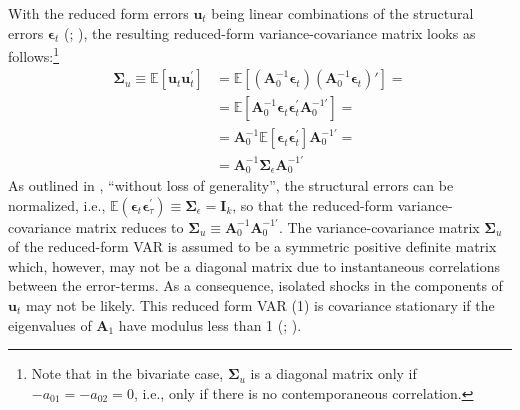 \documentclass[a4paper,11pt,listof=nochaptergap,oneside,pointednumbers,bibtotoc,bigheadings,liststotoc,hidelinks]{scrbook}
\theoremstyle{mysatz}
\theoremstyle{mydefinition}
\theoremstyle{mytheorem}
\theoremstyle{mybemerkung}
\newcommand{\vect}[1]{\boldsymbol{\mathbf{#1}}}
\begin{document}
With the reduced form errors $\vect{u}_t$ being linear combinations of the structural errors $\vect{\epsilon}_t$ (\citealp{lutkepohlkilian:17}; \citealp{zivot:00}), the resulting reduced-form variance-covariance matrix looks as follows:\footnote{Note that in the bivariate case, $\vect{\Sigma}_u$ is a diagonal matrix only if $-a_{01} = -a_{02} = 0$, i.e., only if there is no contemporaneous correlation.}
\begin{equation} \label{eq:svar6}
\begin{split}
 		\vect{\Sigma}_u \equiv \mathbb{E}[\vect{u}_t\vect{u}_t^'] & = \mathbb{E}[(\vect{A}_0^{-1}\vect{\epsilon}_t) (\vect{A}_0^{-1}\vect{\epsilon}_t)' ] = \\
		& = \mathbb{E}[\vect{A}_0^{-1}\vect{\epsilon}_t \vect{\epsilon}_t^'\vect{A}_0^{-1'}] = \\
		& = \vect{A}_0^{-1}\mathbb{E}[\vect{\epsilon}_t \vect{\epsilon}_t^']\vect{A}_0^{-1'} = \\
		& = \vect{A}_0^{-1}\vect{\Sigma}_\epsilon\vect{A}_0^{-1'}
\end{split}								
\end{equation}
As outlined in \citet[p. 109]{lutkepohlkilian:17}, ``without loss of generality'', the structural errors can be normalized, i.e., $\mathbb{E}(\vect{\epsilon}_t\vect{\epsilon}_{\tau}^') \equiv \vect{\Sigma}_\epsilon = \vect{\mathbf{I}}_k$, so that the reduced-form variance-covariance matrix reduces to $\vect{\Sigma}_u \equiv \vect{A}_0^{-1}\vect{A}_0^{-1'}$. The variance-covariance matrix $\vect{\Sigma}_u$ of the reduced-form VAR is assumed to be a symmetric positive definite matrix \citep{lutkepohlkilian:17} which, however, may not be a diagonal matrix due to instantaneous correlations between the error-terms. As a consequence, isolated shocks in the components of $\vect{u}_t$ may not be likely. This reduced form VAR (1) is covariance stationary if the eigenvalues of $\vect{A}_1$ have modulus less than 1 (\citealp{lutkepohlkilian:17}; \citealp{zivot:00}).
\end{document}
